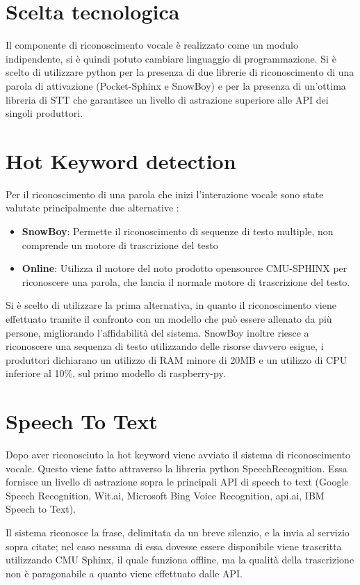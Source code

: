\documentclass[twoside]{supsistudent}
\begin{document}
\section{Scelta tecnologica}
Il componente di riconoscimento vocale è realizzato come un modulo indipendente, si è quindi potuto cambiare linguaggio di programmazione.
Si è scelto di utilizzare python per la presenza di due librerie di riconoscimento di una parola di attivazione (Pocket-Sphinx e SnowBoy) e per la presenza di un'ottima libreria di STT che garantisce un livello di astrazione superiore alle API dei singoli produttori.

\section{Hot Keyword detection}

Per il riconoscimento di una parola che inizi l'interazione vocale sono state valutate principalmente due alternative :
\begin{itemize}
	\item \textbf{SnowBoy}: Permette il riconoscimento di sequenze di testo multiple, non comprende un motore di trascrizione del testo \cite{snowboy}
	\item \textbf{Online}: Utilizza il motore del noto prodotto opensource CMU-SPHINX per riconoscere una parola, che lancia il normale motore di trascrizione del testo.\cite{cmusphinx}
\end{itemize}
Si è scelto di utilizzare la prima alternativa, in quanto il riconoscimento viene effettuato tramite il confronto con un modello che può essere allenato da più persone, migliorando l'affidabilità del sistema. SnowBoy inoltre riesce a riconoscere una sequenza di testo utilizzando delle risorse davvero esigue, i produttori dichiarano un utilizzo di RAM minore di 20MB e un utilizzo di CPU inferiore al 10\%,  sul primo modello di raspberry-py. \cite{snowboy-cpu-usage}
\section{Speech To Text}
Dopo aver riconosciuto la hot keyword viene avviato il sistema di riconoscimento vocale. Questo viene fatto attraverso la libreria python SpeechRecognition. Essa fornisce un livello di astrazione sopra le principali API di speech to text (Google Speech Recognition, Wit.ai, Microsoft Bing Voice Recognition, api.ai, IBM Speech to Text).\cite{python-Speech-Recognizer}

Il sistema riconosce la frase, delimitata da un breve silenzio, e la invia al servizio sopra citate; nel caso nessuna di essa dovesse essere disponibile viene trascritta utilizzando CMU Sphinx, il quale funziona offline, ma la qualità della trascrizione non è paragonabile a quanto viene effettuato dalle API.
\end{document}
